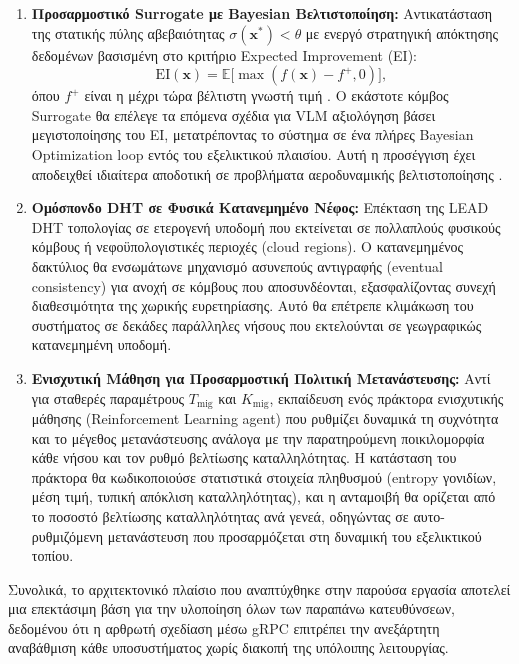 \begin{enumerate}
    \item \textbf{Προσαρμοστικό Surrogate με Bayesian Βελτιστοποίηση:} Αντικατάσταση της στατικής πύλης αβεβαιότητας $\sigma(\bm{x}^*) < \theta$ με ενεργό στρατηγική απόκτησης δεδομένων βασισμένη στο κριτήριο Expected Improvement (EI):
    \begin{equation}
    \label{eq:ei_acquisition}
        \text{EI}(\bm{x}) = \mathbb{E}\bigl[\max(f(\bm{x}) - f^+, 0)\bigr],
    \end{equation}
    όπου $f^+$ είναι η μέχρι τώρα βέλτιστη γνωστή τιμή \cite{jones1998ego}. Ο εκάστοτε κόμβος Surrogate θα επέλεγε τα επόμενα σχέδια για VLM αξιολόγηση βάσει μεγιστοποίησης του EI, μετατρέποντας το σύστημα σε ένα πλήρες Bayesian Optimization loop εντός του εξελικτικού πλαισίου. Αυτή η προσέγγιση έχει αποδειχθεί ιδιαίτερα αποδοτική σε προβλήματα αεροδυναμικής βελτιστοποίησης \cite{forrester2008engineering}.

    \item \textbf{Ομόσπονδο DHT σε Φυσικά Κατανεμημένο Νέφος:} Επέκταση της LEAD DHT τοπολογίας σε ετερογενή υποδομή που εκτείνεται σε πολλαπλούς φυσικούς κόμβους ή νεφοϋπολογιστικές περιοχές (cloud regions). Ο κατανεμημένος δακτύλιος θα ενσωμάτωνε μηχανισμό ασυνεπούς αντιγραφής (eventual consistency) για ανοχή σε κόμβους που αποσυνδέονται, εξασφαλίζοντας συνεχή διαθεσιμότητα της χωρικής ευρετηρίασης. Αυτό θα επέτρεπε κλιμάκωση του συστήματος σε δεκάδες παράλληλες νήσους που εκτελούνται σε γεωγραφικώς κατανεμημένη υποδομή.

    \item \textbf{Ενισχυτική Μάθηση για Προσαρμοστική Πολιτική Μετανάστευσης:} Αντί για σταθερές παραμέτρους $T_{\text{mig}}$ και $K_{\text{mig}}$, εκπαίδευση ενός πράκτορα ενισχυτικής μάθησης (Reinforcement Learning agent) που ρυθμίζει δυναμικά τη συχνότητα και το μέγεθος μετανάστευσης ανάλογα με την παρατηρούμενη ποικιλομορφία κάθε νήσου και τον ρυθμό βελτίωσης καταλληλότητας. Η κατάσταση του πράκτορα θα κωδικοποιούσε στατιστικά στοιχεία πληθυσμού (entropy γονιδίων, μέση τιμή, τυπική απόκλιση καταλληλότητας), και η ανταμοιβή θα ορίζεται από το ποσοστό βελτίωσης καταλληλότητας ανά γενεά, οδηγώντας σε αυτο-ρυθμιζόμενη μετανάστευση που προσαρμόζεται στη δυναμική του εξελικτικού τοπίου.
\end{enumerate}

Συνολικά, το αρχιτεκτονικό πλαίσιο που αναπτύχθηκε στην παρούσα εργασία αποτελεί μια επεκτάσιμη βάση για την υλοποίηση όλων των παραπάνω κατευθύνσεων, δεδομένου ότι η αρθρωτή σχεδίαση μέσω gRPC επιτρέπει την ανεξάρτητη αναβάθμιση κάθε υποσυστήματος χωρίς διακοπή της υπόλοιπης λειτουργίας.
